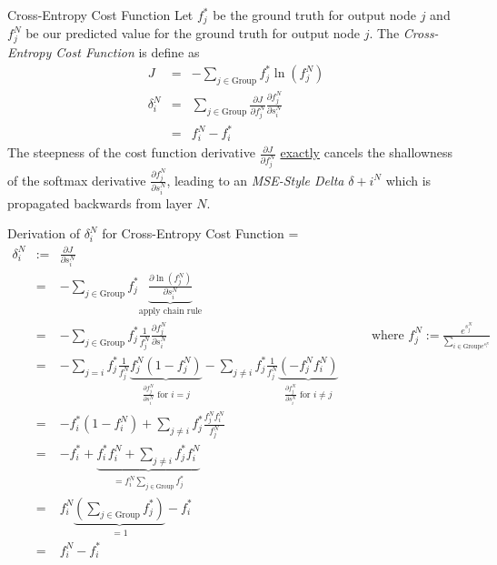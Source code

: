 \documentclass[11pt,a4paper]{article}
\begin{document}
  \begin{definition}{Cross-Entropy Cost Function}
    Let $f^*_j$ be the ground truth for output node $j$ and $f_j^N$ be our predicted value for the ground truth for output node $j$. The \textit{Cross-Entropy Cost Function} is define as
    \[\begin{array}{rrl}
    J&=&-\displaystyle\sum_{j\in\text{Group}}f_j^*\ln(f_j^N)\\
    \delta_i^N&=&\displaystyle\sum_{j\in\text{Group}}\frac{\partial J}{\partial f_j^N}\frac{\partial f_j^N}{\partial s_i^N}\\
    &=&f_i^N-f_i^*
    \end{array}\]
    The steepness of the cost function derivative $\frac{\partial J}{\partial f_j^N}$ \underline{exactly} cancels the shallowness of the softmax derivative $\frac{\partial f_j^N}{\partial s_i^N}$, leading to an \textit{MSE-Style Delta} $\delta+i^N$ which is propagated backwards from layer $N$.
  \end{definition}

  \begin{proposition}{Derivation of $\delta_i^N$ for Cross-Entropy Cost Function}
    \everymath={\displaystyle}
    \[\begin{array}{rrlcl}
      \delta_i^N&:=&\frac{\partial J}{\partial s_i^N}&\quad&\\
      &=&-\sum_{j\in\text{Group}}f_j^*\underbrace{\frac{\partial \ln(f_j^N)}{\partial s_i^N}}_\text{apply chain rule}\\
      &=&-\sum_{j\in\text{Group}}f_j^*\frac1{f_j^N}\frac{\partial f_j^N}{\partial s_i^N}&&\text{where }f_j^N:=\frac{e^{s_j^N}}{\sum_{i\in\text{Group}e^{s_i^N}}}\\
      &=&-\sum_{j=i}f_j^*\frac1{f_j^N}\underbrace{f_j^N(1-f_j^N)}_{\frac{\partial f_j^N}{\partial s_i^N}\text{ for }i=j}-\sum_{j\neq i}f_j^*\frac1{f_j^N}\underbrace{(-f_j^Nf_i^N)}_{\frac{\partial f_j^N}{\partial s_i^N}\text{ for }i\neq j}\\
      &=&-f_i^*(1-f_i^N)+\sum_{j\neq i}f_j^*\frac{f_j^Nf_i^N}{f_j^N}\\
      &=&-f_i^*+\underbrace{f_i^*f_i^N+\sum_{j\neq i}f_j^*f_i^N}_{=f_i^N\sum_{j\in\text{Group}}f_j^*}\\
      &=&f_i^N\underbrace{\left(\sum_{j\in\text{Group}}f_j^*\right)}_{=1}-f_i^*\\
      &=&f_i^N-f_i^*
    \end{array}\]
  \end{proposition}
\end{document}
